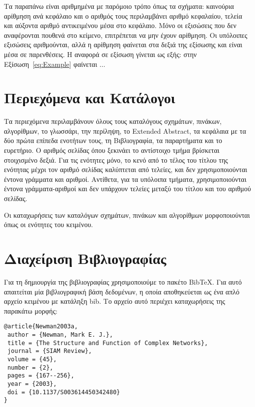 Τα παραπάνω είναι αριθμημένα με παρόμοιο τρόπο όπως τα σχήματα: καινούρια αρίθμηση ανά κεφάλαιο και ο αριθμός τους περιλαμβάνει αριθμό κεφαλαίου, τελεία και αύξοντα αριθμό αντικειμένου μέσα στο κεφάλαιο.
Μόνο οι εξισώσεις που δεν αναφέρονται πουθενά στο κείμενο, επιτρέπεται να μην έχουν αρίθμηση.
Οι υπόλοιπες εξισώσεις αριθμούνται, αλλά η αρίθμηση φαίνεται στα δεξιά της εξίσωσης και είναι μέσα σε παρενθέσεις.
Η αναφορά σε εξίσωση γίνεται ως εξής: στην Εξίσωση~\ref{eq:Example} φαίνεται $\ldots$

\section{Περιεχόμενα και Κατάλογοι}
\label{subsec:Contents}

  Τα περιεχόμενα περιλαμβάνουν όλους τους καταλόγους σχημάτων, πινάκων, αλγορίθμων, το γλωσσάρι, την περίληψη, το Extended Abstract, τα κεφάλαια με τα δύο πρώτα επίπεδα ενοτήτων τους, τη Βιβλιογραφία, τα παραρτήματα και το ευρετήριο.
  Ο αριθμός σελίδας όπου ξεκινάει το αντίστοιχο τμήμα βρίσκεται στοιχισμένο δεξιά.
  Για τις ενότητες μόνο, το κενό από το τέλος του τίτλου της ενότητας μέχρι τον αριθμό σελίδας καλύπτεται από τελείες, και δεν χρησιμοποιούνται έντονα γράμματα και αριθμοί.
  Αντίθετα, για τα υπόλοιπα τμήματα, χρησιμοποιούνται έντονα γράμματα-αριθμοί και δεν υπάρχουν τελείες μεταξύ του τίτλου και του αριθμού σελίδας.

  Οι καταχωρήσεις των καταλόγων σχημάτων, πινάκων και αλγορίθμων μορφοποιούνται όπως οι ενότητες του κειμένου.


\section{Διαχείριση Βιβλιογραφίας}
\label{sec:Bibliography}
Για τη δημιουργία της βιβλιογραφίας χρησιμοποιούμε το πακέτο BibTeX.
Για αυτό απαιτείται μία βιβλιογραφική βάση δεδομένων, η οποία αποθηκεύεται ως 
ένα απλό αρχείο κειμένου με κατάληξη bib.
Το αρχείο αυτό περιέχει καταχωρήσεις της παρακάτω μορφής:

\begin{verbatim}
@article{Newman2003a,
 author = {Newman, Mark E. J.},
 title = {The Structure and Function of Complex Networks},
 journal = {SIAM Review},
 volume = {45},
 number = {2},
 pages = {167--256},
 year = {2003},
 doi = {10.1137/S003614450342480}
}
\end{verbatim}

